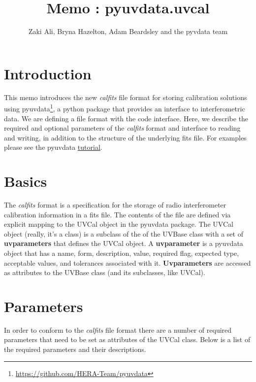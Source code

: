 \documentclass[11pt, oneside]{article}   	%
\title{Memo : pyuvdata.uvcal}
\author{Zaki Ali, Bryna Hazelton, Adam Beardsley and the pyvdata team}
\begin{document}
\maketitle
\section{Introduction}
This memo introduces the new \textit{calfits} file format for storing
calibration solutions using
pyuvdata\footnote{\url{https://github.com/HERA-Team/pyuvdata}}, a python package that
provides an interface to interferometric data. We are defining a file format
with the code interface. Here, we describe the required and optional parameters
of the \textit{calfits} format and interface to reading and writing, in addition
to the structure of the underlying fits file. For examples please see the
pyuvdata \href{http://pyuvdata.readthedocs.io/en/latest/tutorial.html}{tutorial}.

\section{Basics}

The \textit{calfits} format is a specification for the storage of radio
interferometer calibration information in a fits file.  The contents of the file
are defined via explicit mapping to the UVCal object in the pyuvdata package.
The UVCal object (really, it's a class) is a subclass of the of the UVBase class
with a set of \textbf{uvparameters} that defines the UVCal object. A
\textbf{uvparameter} is a pyuvdata object that has a name, form, description,
value, required flag, expected type, acceptable values, and tolerances
associated with it.  \textbf{Uvparameters} are accessed as attributes to the
UVBase class (and its subclasses, like UVCal).

\section{Parameters}
In order to conform to the \textit{calfits} file format there are a number of
required parameters that need to be set as attributes of the UVCal class. Below
is a list of the required parameters and their descriptions.
\end{document}
